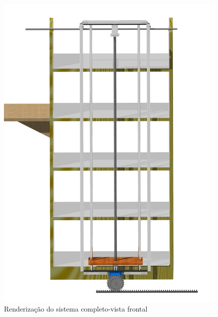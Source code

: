 \begin{figure}[!h]		
\centering
\includegraphics[scale=0.4]{figuras/render_frente}
\caption{Renderização do sistema completo-vista frontal}
\end{figure}
\FloatBarrier


